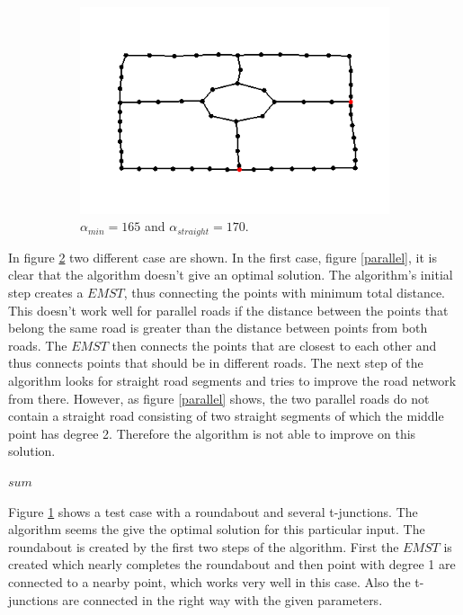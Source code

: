 \documentclass[11pt]{article}
\begin{document}
\begin{figure}[h]
\begin{subfigure}{0.4\linewidth}
  \includegraphics[width=\linewidth]{roundabout167_170}
  \caption{$\alpha_{min}=165$ and $\alpha_{straight}=170$.}
  \label{roundabout}
  \end{subfigure}
  \caption{}
  \label{testcases}
\end{figure}

In figure \ref{testcases} two different case are shown. In the first case, figure \ref{parallel}, it is clear that the algorithm doesn't give an optimal solution. The algorithm's initial step creates a $EMST$, thus connecting the points with minimum total distance. This doesn't work well for parallel roads if the distance between the points that belong the same road is greater than the distance between points from both roads. The $EMST$ then connects the points that are closest to each other and thus connects points that should be in different roads. The next step of the algorithm looks for straight road segments and tries to improve the road network from there. However, as figure \ref{parallel} shows, the two parallel roads do not contain a straight road consisting of two straight segments of which the middle point has degree 2. Therefore the algorithm is not able to improve on this solution.

$sum$

Figure \ref{roundabout} shows a test case with a roundabout and several t-junctions. The algorithm seems the give the optimal solution for this particular input. The roundabout is created by the first two steps of the algorithm. First the $EMST$ is created which nearly completes the roundabout and then point with degree 1 are connected to a nearby point, which works very well in this case. Also the t-junctions are connected in the right way with the given parameters.
\end{document}
